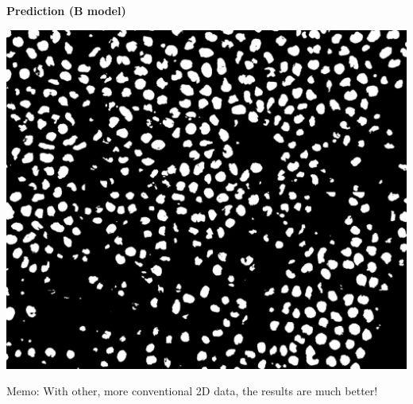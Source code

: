 \begin{frame}
\begin{minipage}[h!]{0.30\textwidth}
  \end{minipage}\hfill
  \begin{minipage}[h!]{0.30\textwidth}
    \centering
    \textbf{Prediction (B model)}\par\medskip
    \includegraphics[scale=0.1]{./img/result_pred_bio.png}
  \end{minipage}

  \medskip
  Memo: With other, more conventional 2D data, the results are much better!

\end{frame}
\fi
